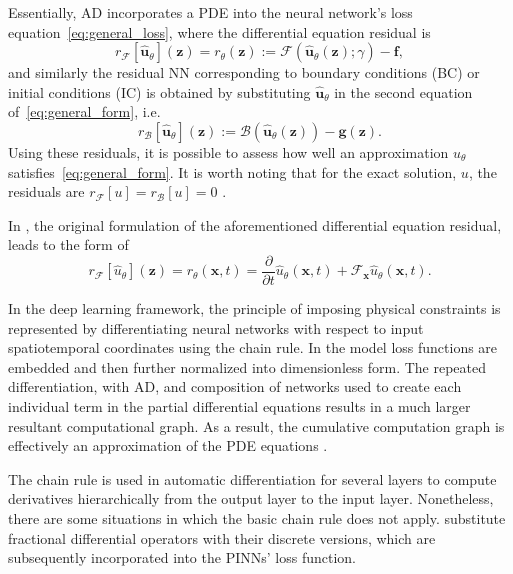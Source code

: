 \documentclass[pdflatex,sn-basic]{sn-jnl}%
\theoremstyle{thmstyleone}%
\theoremstyle{thmstyletwo}%
\theoremstyle{thmstylethree}%
\begin{document}
Essentially, AD incorporates a PDE into the neural network's loss equation~\eqref{eq:general_loss}, where
the differential equation residual is 
$$
r_\mathcal{F}[ \hat{\bm{u}}_{\theta}](\bm{z}) = r_{\theta}(\bm{z}):= \mathcal{F}( \hat{\bm{u}}_{\theta} (\bm{z}); \gamma  ) -  \bm{f},
$$
and similarly the residual NN corresponding to boundary conditions (BC) or initial conditions (IC) is obtained by substituting $\hat{\bm{u}}_{\theta}$ in the second equation of~\eqref{eq:general_form}, i.e.
$$
r_\mathcal{B}[ \hat{\bm{u}}_{\theta}](\bm{z}) :=
\mathcal{B}(\hat{\bm{u}}_{\theta}(\bm{z})) -  \bm{g}(\bm{z}).
$$
%
Using these residuals, it is possible to assess how well an approximation $u_{\theta}$ satisfies~\eqref{eq:general_form}.
It is worth noting that for the exact solution, $u$, the residuals are $r_\mathcal{F}[u]=r_\mathcal{B}[u]=0$ \citep{De2022_ErrorEstimatesPhysics_JagDRJM}.


In %
\cite{Rai2018_HiddenPhysicsModels_KarRK, Rai2019_PhysicsInformedNeural_PerRPK}, the original formulation of the aforementioned differential equation residual, leads to the form of
$$
r_\mathcal{F}[ \hat{u}_{\theta}](\bm{z}) =  r_{\theta}(\bm{x},t)= \frac{\partial}{\partial t} \hat{u}_{\theta}(\bm{x},t)  + \mathcal{F}_{\bm{x}}\hat{u}_{\theta}(\bm{x},t).
$$


In the deep learning framework, the principle of imposing physical constraints is represented by differentiating neural networks with respect to input spatiotemporal coordinates using the chain rule. 
%
In \cite{Mat2021_UncoveringTurbulentPlasma_FraMFH} the model loss functions are embedded and then further normalized into dimensionless form.
%
The repeated differentiation, with AD, and composition of networks used to create each individual term in the partial differential equations results in a much larger resultant computational graph.
As a result, the cumulative computation graph is effectively an approximation of the PDE equations \citep{Mat2021_UncoveringTurbulentPlasma_FraMFH}.



The chain rule is used in automatic differentiation for several layers to compute derivatives hierarchically from the output layer to the input layer.
Nonetheless, there are some situations in which the basic chain rule does not apply.
\cite{Pan2019_FpinnsFractionalPhysics_LuPLK}  substitute fractional differential operators with their discrete versions, which are subsequently incorporated into the PINNs' loss function. 
\end{document}
